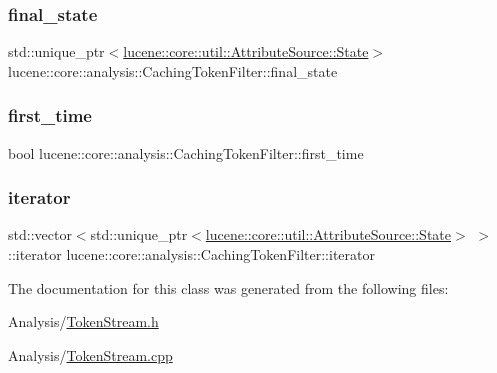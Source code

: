 \subsubsection{\texorpdfstring{final\+\_\+state}{final\_state}}
{\footnotesize\ttfamily std\+::unique\+\_\+ptr$<$\mbox{\hyperlink{classlucene_1_1core_1_1util_1_1AttributeSource_1_1State}{lucene\+::core\+::util\+::\+Attribute\+Source\+::\+State}}$>$ lucene\+::core\+::analysis\+::\+Caching\+Token\+Filter\+::final\+\_\+state\hspace{0.3cm}{\ttfamily [private]}}

\mbox{\label{classlucene_1_1core_1_1analysis_1_1CachingTokenFilter_aea35743bf279c67214d8567e6230ed4c}} 
\subsubsection{\texorpdfstring{first\+\_\+time}{first\_time}}
{\footnotesize\ttfamily bool lucene\+::core\+::analysis\+::\+Caching\+Token\+Filter\+::first\+\_\+time\hspace{0.3cm}{\ttfamily [private]}}

\mbox{\label{classlucene_1_1core_1_1analysis_1_1CachingTokenFilter_a23615478893652578c8cab6ca5275ff3}} 
\subsubsection{\texorpdfstring{iterator}{iterator}}
{\footnotesize\ttfamily std\+::vector$<$std\+::unique\+\_\+ptr$<$\mbox{\hyperlink{classlucene_1_1core_1_1util_1_1AttributeSource_1_1State}{lucene\+::core\+::util\+::\+Attribute\+Source\+::\+State}}$>$ $>$\+::iterator lucene\+::core\+::analysis\+::\+Caching\+Token\+Filter\+::iterator\hspace{0.3cm}{\ttfamily [private]}}



The documentation for this class was generated from the following files\+:\begin{DoxyCompactItemize}
\item 
Analysis/\mbox{\hyperlink{TokenStream_8h}{Token\+Stream.\+h}}\item 
Analysis/\mbox{\hyperlink{TokenStream_8cpp}{Token\+Stream.\+cpp}}\end{DoxyCompactItemize}

